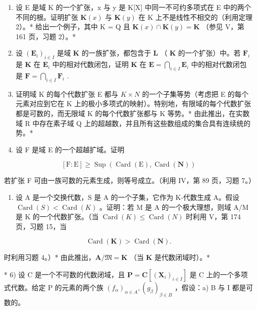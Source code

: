 \BourbakiExerciseGroup

\begin{enumerate}
\def\labelenumi{\arabic{enumi})}
\item
  设 E 是域 K 的一个扩张，x 与 y 是 K{[}X{]} 中同一不可约多项式在 E 中的两个不同的根。证明扩张 \(\mathbf{K}(x)\) 与 \(\mathbf{K}(y)\) 在 K 上不是线性不相交的（利用定理 2）。* 给出一个例子，其中 K = Q 且 \(\mathbf{K}(x) \cap \mathbf{K}(y) = \mathbf{K}\) （参见 V，第 161 页，习题 2）。*
\item
  设 \((\mathbf{E}_i)_{i\in I}\) 是域 \(\mathbf{K}\) 的一族扩张，都包含于 \(\mathbf{L}\) （ \(\mathbf{K}\) 的一个扩张）中。若 \(\mathbf{F}_i\) 是 \(\mathbf{K}\) 在 \(\mathbf{E}_i\) 中的相对代数闭包，证明 \(\mathbf{K}\) 在 \(\mathbf{E} = \bigcap_{i\in I}\mathbf{E}_i\) 中的相对代数闭包是 \(\mathbf{F} = \bigcap_{i\in I}\mathbf{F}_i\) .
\item
  证明域 K 的每个代数扩张 E 都与 \(K \times N\) 的一个子集等势（考虑把 E 的每个元素对应到它在 K 上的极小多项式的映射）。特别地，有限域的每个代数扩张都是可数的，而无限域 K 的每个代数扩张都与 K 等势。* 由此推出，在实数域 R 中存在素子域 Q 上的超越数，并且所有这些数组成的集合具有连续统的势。*
\item
  设 F 是域 E 的一个超越扩域。证明
\end{enumerate}

\[
[ \mathrm{F}: \mathrm{E} ] \geqslant \operatorname * {S u p} (\operatorname{Card} (\mathrm{E}), \operatorname{Card} (\mathbf {N}))
\]

若扩张 F 可由一族可数的元素生成，则等号成立。（利用 IV，第 89 页，习题 7。）

\begin{enumerate}
\def\labelenumi{\arabic{enumi})}
\setcounter{enumi}{4}
\tightlist
\item
  设 A 是一个交换代数，S 是 A 的一个子集，它作为 K-代数生成 A。假设 \(\operatorname{Card}(S) < \operatorname{Card}(K)\) 。证明：若 M 是 A 的一个极大理想，则域 A/M 是 K 的一个代数扩张。（当 \(\operatorname{Card}(K) \leqslant \operatorname{Card}(N)\) 时利用 V，第 174 页，习题 15，当
\end{enumerate}

\[
\operatorname{Card} (\mathbf {K}) > \operatorname{Card} (\mathbf {N}).
\]

时利用习题 4。）* 由此推出，\(\mathbf{A} / \mathfrak{M} = \mathbf{K}\) （当 \(\mathbf{K}\) 是代数闭域时）。*

* 6) 设 C 是一个不可数的代数闭域，且 \(\mathbf{P} = \mathbf{C}[(\mathbf{X}_i)_{i \in I}]\) 是 C 上的一个多项式代数。给定 P 的元素的两个族 \((f_\alpha)_{\alpha \in A}, (g_\beta)_{\beta \in B}\) ，假设：a) B 与 I 都是可数的。

